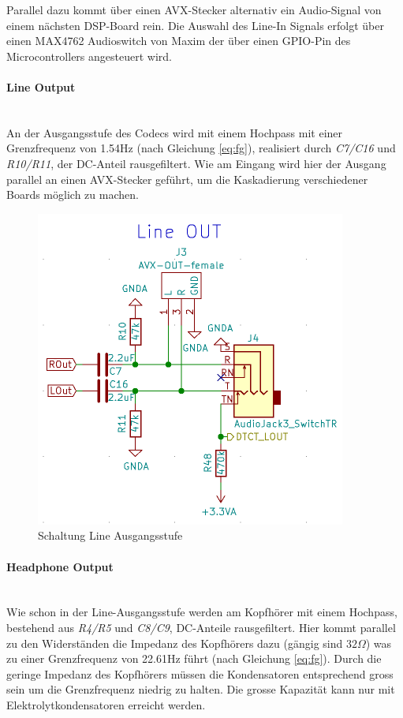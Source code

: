 Parallel dazu kommt über einen AVX-Stecker alternativ ein Audio-Signal von einem nächsten DSP-Board rein. Die Auswahl des Line-In Signals erfolgt über einen MAX4762 \cite{max4762} Audioswitch von Maxim der über einen GPIO-Pin des Microcontrollers angesteuert wird. 
\\
\paragraph{Line Output}\vspace{-0.3cm}\\
\label{par:LineOUT}
An der Ausgangsstufe des Codecs wird mit einem Hochpass mit einer Grenzfrequenz von 1.54Hz (nach Gleichung \ref{eq:fg}), realisiert durch \textit{C7/C16} und \textit{R10/R11}, der DC-Anteil rausgefiltert. Wie am Eingang wird hier der Ausgang parallel an einen AVX-Stecker geführt, um die Kaskadierung verschiedener Boards möglich zu machen.


\begin{figure} [H]
\begin{center}
 \includegraphics[scale=0.6]{../graphics/Schema_LineOUT.png}
\caption{Schaltung Line Ausgangsstufe}
\label{fig:Schema_LineOUT}
\end{center}
\end{figure}

\paragraph{Headphone Output}\vspace{-0.3cm}\\
\label{par:HPOUT}
Wie schon in der Line-Ausgangsstufe werden am Kopfhörer mit einem Hochpass, bestehend aus \textit{R4/R5} und \textit{C8/C9}, DC-Anteile rausgefiltert. Hier kommt parallel zu den Widerständen die Impedanz des Kopfhörers dazu (gängig sind $32\Omega$) was zu einer Grenzfrequenz von 22.61Hz führt (nach Gleichung \ref{eq:fg}). Durch die geringe Impedanz des Kopfhörers müssen die Kondensatoren entsprechend gross sein um die Grenzfrequenz niedrig zu halten. Die grosse Kapazität kann nur mit Elektrolytkondensatoren erreicht werden.

